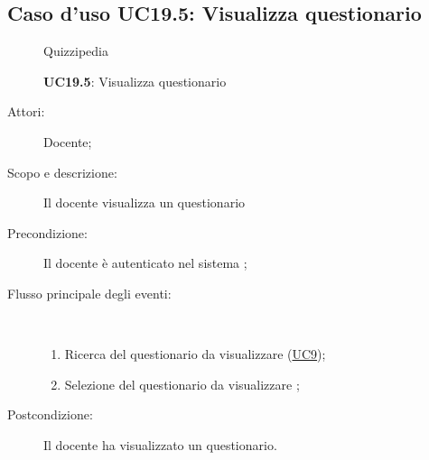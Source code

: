 \subsection{Caso d'uso UC19.5: Visualizza questionario}
	\begin{figure}[H]
		\centering
		\begin{resizedtikzpicture}{\textwidth}
		\begin{umlsystem}[x=0, fill=lightgray!20]{Quizzipedia}
		\end{umlsystem}
		\end{resizedtikzpicture}
		\caption{\textbf{UC19.5}: Visualizza questionario}
		\label{UC19.5}
	\end{figure}
\begin{description}
\item[Attori:] Docente;
\item[Scopo e descrizione:] Il docente visualizza un questionario
      \item[Precondizione:] Il docente è autenticato nel sistema
;

        \item[Flusso principale degli eventi:] \ 
 \begin{enumerate}
          \item Ricerca del questionario da visualizzare	 (\hyperlink{UC9}{UC9});
          \item Selezione del questionario da visualizzare	;

      \end{enumerate}
    \item[Postcondizione:] Il docente ha visualizzato un questionario.
  \end{description}
\hypertarget{UC20}{}
